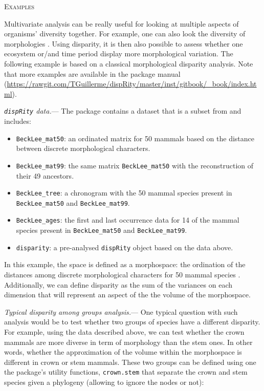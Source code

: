 \documentclass[12pt,letterpaper]{article}
\renewcommand{\section}[1]{%
\bigskip
\begin{center}
\begin{Large}
\normalfont\scshape #1
\medskip
\end{Large}
\end{center}}
\renewcommand{\subsubsection}[1]{%
\vspace{2ex}
\noindent
\textit{#1.}---}
\newcommand{\disp}{\texttt{dispRity} }
\begin{document}
\section{Examples}
Multivariate analysis can be really useful for looking at multiple aspects of organisms' diversity together.
For example, one can also look the diversity of morphologies \citep[or disparity;][]{foote1991morphological}.
Using disparity, it is then also possible to assess whether one ecosystem or/and time period display more morphological variation.
The following example is based on a classical morphological disparity analysis.
Note that more examples are available in the package manual (\url{https://rawgit.com/TGuillerme/dispRity/master/inst/gitbook/_book/index.html}).

\subsubsection{\disp data}
The package contains a dataset that is a subset from \cite{beckancient2014} and includes:

\begin{itemize}
    \item \texttt{BeckLee\_mat50}: an ordinated matrix for 50 mammals based on the distance between discrete morphological characters.
    \item \texttt{BeckLee\_mat99}: the same matrix \texttt{BeckLee\_mat50} with the reconstruction of their 49 ancestors.
    \item \texttt{BeckLee\_tree}: a chronogram with the 50 mammal species present in \texttt{BeckLee\_mat50} and \texttt{BeckLee\_mat99}.
    \item \texttt{BeckLee\_ages}: the first and last occurrence data for 14 of the mammal species present in \texttt{BeckLee\_mat50} and \texttt{BeckLee\_mat99}.
    \item \texttt{disparity}: a pre-analysed \disp object based on the data above.
\end{itemize}

In this example, the space is defined as a morphospace: the ordination of the distances among discrete morphological characters for 50 mammal species \citep[from][]{beckancient2014}.
Additionally, we can define disparity as the sum of the variances on each dimension \citep{foote1991morphological,Wills1994} that will represent an aspect of the the volume of the morphospace.

\subsubsection{Typical disparity among groups analysis}
One typical question with such analysis would be to test whether two groups of species have a different disparity.
For example, using the data described above, we can test whether the crown mammals are more diverse in term of morphology than the stem ones.
In other words, whether the approximation of the volume within the morphospace is different in crown or stem mammals.
These two groups can be defined using one the package's utility functions, \texttt{crown.stem} that separate the crown and stem species given a phylogeny (allowing to ignore the nodes or not):
\end{document}
